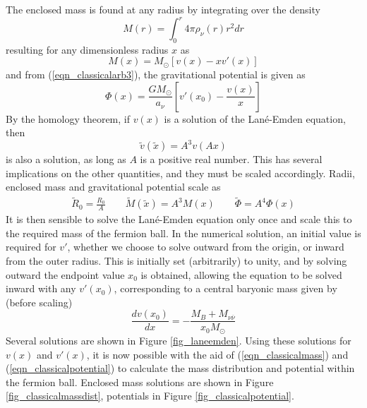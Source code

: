 The enclosed mass is found at any radius by integrating over the density
\begin{equation}
	M(r) = \int^r_0 4 \pi \rho_\nu (r) r^2 dr
	\label{eqn_classicalmassintegral}
\end{equation}
resulting for any dimensionless radius $x$ as
\begin{equation}
	M(x) = M_\odot\left[v(x)-xv'(x)\right]
	\label{eqn_classicalmass}
\end{equation}
and from (\ref{eqn_classicalarb3}), the gravitational potential is given as
\begin{equation}
	\Phi(x) = \frac{G M_\odot}{a_\nu}\left[v'(x_0)-\frac{v(x)}{x}\right]
	\label{eqn_classicalpotential}
\end{equation}
By the homology theorem, if $v(x)$ is a solution of the Lan\'e-Emden equation, then
\begin{equation}
	\widetilde v(\widetilde x) = A^3 v(Ax)
	\label{eqn_classicalhomology}
\end{equation}
is also a solution, as long as $A$ is a positive real number. This has several implications on the other quantities, and they must
be scaled accordingly. Radii, enclosed mass and gravitational potential scale as
\begin{eqnarray*}
	\widetilde R_0 = \frac{R_0}{A} \qquad
	\widetilde M(\widetilde x) = A^3 M(x) \qquad
	\widetilde \Phi = A^4 \Phi(x)
\end{eqnarray*}
It is then sensible to solve the Lan\'e-Emden equation only once and scale this to the required mass of the fermion ball.
In the numerical solution, an initial value is required for $v'$, whether we choose to solve outward from the origin, or
inward from the outer radius. This is initially set (arbitrarily) to unity, and by solving outward the endpoint value
$x_0$ is obtained, allowing the equation to be solved inward with any $v'(x_0)$, corresponding to a central baryonic
mass given by (before scaling) 
\begin{equation}
	\frac{dv(x_0)}{dx} = - \frac{M_B+M_{\nu \overline{\nu}}}{x_0M_\odot}
	\label{eqn_classicalinitialdvdr}
\end{equation}
Several solutions are shown in Figure \ref{fig_laneemden}.
Using these solutions for $v(x)$ and $v'(x)$, it is now possible with the aid of (\ref{eqn_classicalmass}) and
(\ref{eqn_classicalpotential}) to calculate the mass distribution and potential within the fermion ball. Enclosed mass solutions are
shown in Figure \ref{fig_classicalmassdist}, potentials in Figure \ref{fig_classicalpotential}.

